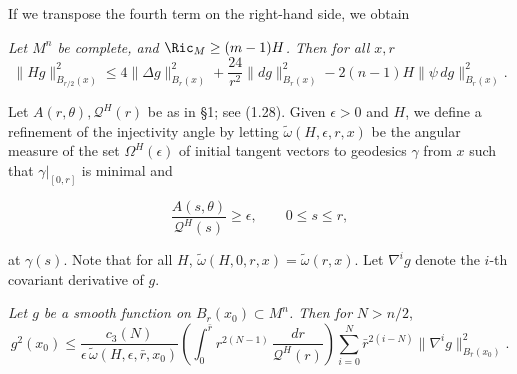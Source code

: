 If we transpose the fourth term on the right-hand side, we obtain

\begin{proposition}
\label{prop:coercive-hessian-estimate}

\textit{Let $M^n$ be complete, and $\Ric_M \geq (m-1)H$. Then for all $x, r$}
\begin{equation}\tag{2.43}
\|Hg\|^2_{B_{r/2}(x)} \le 4\|\Delta g\|^2_{B_r(x)} + \frac{24}{r^2}\|dg\|^2_{B_r(x)}
- 2(n-1)H\|\psi\,dg\|^2_{B_r(x)}.
\end{equation}
\end{proposition}

Let $A(r,\theta), \mathcal{Q}^H(r)$ be as in \S1; see (1.28). Given $\epsilon > 0$ and $H$, we define a refinement of the injectivity angle by letting $\widetilde{\omega}(H,\epsilon,r,x)$ be the angular
measure of the set $\Omega^H(\epsilon)$ of initial tangent vectors to geodesics $\gamma$ from $x$ such
that $\gamma|_{[0,r]}$ is minimal and

\begin{equation}\tag{2.44}
\frac{A(s,\theta)}{\mathcal{Q}^H(s)} \ge \epsilon,\qquad 0 \le s \le r,
\end{equation}

at $\gamma(s)$. Note that for all $H$, $\widetilde{\omega}(H,0,r,x)=\widetilde{\omega}(r,x)$. Let $\nabla^i g$ denote the $i$-th
covariant derivative of $g$.

\begin{proposition}
\label{prop:pointwise-sobolev-estimate}

\textit{Let $g$ be a smooth function on $B_r(x_0)\subset M^n$. Then for}
$N>n/2$,
\begin{equation}\tag{2.45}
g^2(x_0)\le \frac{c_3(N)}{\epsilon\,\widetilde{\omega}(H,\epsilon,\bar r,x_0)}
\left(\int_0^{\bar r} r^{2(N-1)}\,\frac{dr}{\mathcal{Q}^H(r)}\right)
\sum_{i=0}^N \bar r^{2(i-N)}\|\nabla^i g\|^2_{B_{\bar r}(x_0)}.
\end{equation}
\end{proposition}

